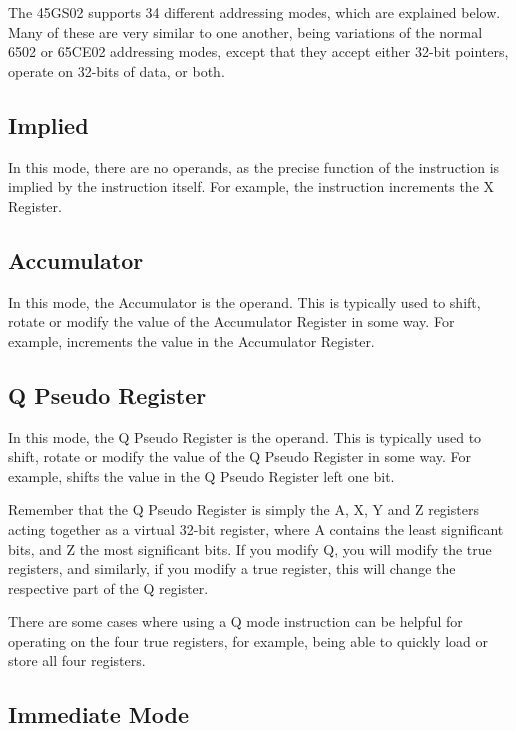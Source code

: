 The 45GS02 supports 34 different addressing modes, which are explained below.
Many of these are very similar to one another, being variations of the normal 6502
or 65CE02 addressing modes, except that they accept either
32-bit pointers, operate on 32-bits of data, or both.

\subsection{Implied}

In this mode, there are no operands, as the precise function of the instruction is
implied by the instruction itself.  For example, the  instruction increments
the X Register.

\subsection{Accumulator}

In this mode, the Accumulator is the operand. This is typically used to shift,
rotate or modify the value of the Accumulator Register in some way.  For example,
 increments the value in the Accumulator Register.

\subsection{Q Pseudo Register}

In this mode, the Q Pseudo Register is the operand. This is typically used to shift,
rotate or modify the value of the Q Pseudo Register in some way.  For example,
 shifts the value in the Q Pseudo Register left one bit.

Remember that the Q Pseudo Register is simply the A, X, Y and Z registers acting together
as a virtual 32-bit register, where A contains the least significant bits, and Z the
most significant bits. If you modify Q, you will modify the true registers, and similarly,
if you modify a true register, this will change the respective part of the Q register.

There are some cases where using a Q mode instruction can be
helpful for operating on the four true registers, for example, being able to quickly
load or store all four registers.

\subsection{Immediate Mode}

